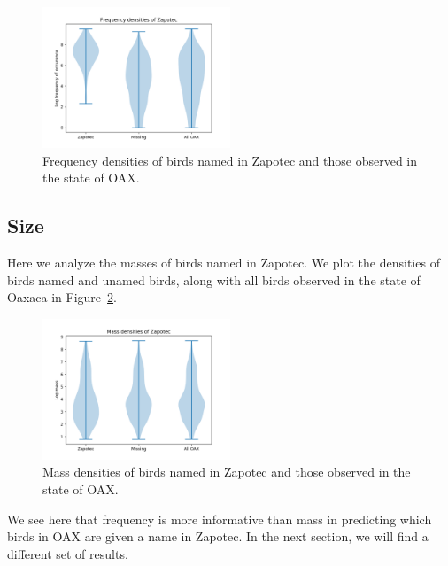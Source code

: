 \documentclass[10pt,letterpaper]{article}
\begin{document}
\begin{figure}[h!]
	\begin{center}
		\includegraphics[width=0.5\textwidth]{./figures/birdfreq-violinplots.png}
        \caption{Frequency densities of birds named in Zapotec and those observed in the state of OAX.}
        \label{fig-birdfreqviolin}
	\end{center}
\end{figure}

\subsection{Size}
Here we analyze the masses of birds named in Zapotec. We plot the densities of birds named and unamed birds, along with all birds observed in the state of Oaxaca in Figure~\ref{fig-birdmassviolin}.

\begin{figure}[h!]
  \begin{center}
    \includegraphics[width=0.5\textwidth]{./figures/birdmass-violinplots.png}
        \caption{Mass densities of birds named in Zapotec and those observed in the state of OAX.}
        \label{fig-birdmassviolin}
  \end{center}
\end{figure}

We see here that frequency is more informative than mass in predicting which birds in OAX are given a name in Zapotec. In the next section, we will find a different set of results.
\end{document}
